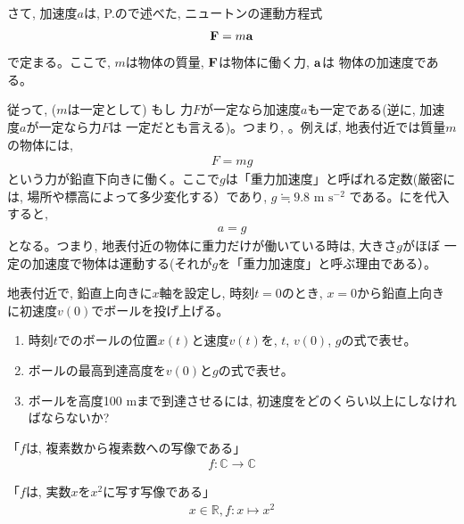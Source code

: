 さて, 加速度$a$は, P.\pageref{eq:Newton_eqmotion}ので述べた, 
ニュートンの運動方程式
\begin{eqnarray}{\bf F}=m{\bf a}\label{eq:F_ma3}\end{eqnarray}
で定まる。ここで, $m$は物体の質量, ${\bf F}$は物体に働く力, ${\bf a}$は
物体の加速度である。


従って, ($m$は一定として) もし
力$F$が一定なら加速度$a$も一定である(逆に, 加速度$a$が一定なら力$F$は
一定だとも言える)。つまり, 。例えば, 地表付近では質量$m$の物体には, 
\begin{eqnarray}F=mg\label{eq:Fgravity}\end{eqnarray}
という力が鉛直下向きに働く。ここで$g$は「重力加速度」と呼ばれる定数(厳密には, 
場所や標高によって多少変化する）であり, $g\fallingdotseq9.8\text{ m s}^{-2}$
である。にを代入すると, 
\begin{eqnarray}a=g\end{eqnarray}
となる。つまり, 地表付近の物体に重力だけが働いている時は, 大きさ$g$がほぼ
一定の加速度で物体は運動する(それが$g$を「重力加速度」と呼ぶ理由である）。

\begin{q}\label{q:int_velac} 地表付近で, 鉛直上向きに$x$軸を設定し, 時刻$t=0$のとき, $x=0$から鉛直上向き
に初速度$v(0)$でボールを投げ上げる。
\begin{enumerate}
\item 時刻$t$でのボールの位置$x(t)$と速度$v(t)$を, $t$, $v(0)$, $g$の式で表せ。
\item ボールの最高到達高度を$v(0)$と$g$の式で表せ。
\item ボールを高度100 mまで到達させるには, 初速度をどのくらい以上にしなければならないか?
\end{enumerate}\end{q}





\item 「$f$は, 複素数から複素数への写像である」
\begin{eqnarray}f: \mathbb{C} \rightarrow \mathbb{C}\end{eqnarray}
\item 「$f$は, 実数$x$を$x^2$に写す写像である」
\begin{eqnarray}x\in\mathbb{R}, f: x \mapsto x^2\end{eqnarray}



